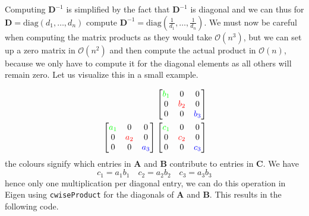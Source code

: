 \documentclass{article}
\begin{document}
Computing $\mathbf{D}^{-1}$ is simplified by the fact that $\mathbf{D}^{-1}$ is diagonal and we can thus for $\mathbf{D} = \text{diag}\left(d_{1}, \dots, d_{n}\right)$ compute $\mathbf{D}^{-1} = \text{diag}\left(\frac{1}{d_{1}}, \dots, \frac{1}{d_{n}}\right)$. We must now be careful when computing the matrix products as they would take $\mathcal{O}\left(n^{3}\right)$, but we can set up a zero matrix in $\mathcal{O}\left(n^{2}\right)$ and then compute the actual product in $\mathcal{O}\left(n\right)$, because we only have to compute it for the diagonal elements as all others will remain zero. Let us visualize this in a small example.

\begin{align*}
&\phantom{
    \begin{bmatrix}
        1 & 0 & 0 \\
        0 & 2 & 0 \\
        0 & 0 & 3
    \end{bmatrix}}\hspace{16px}
    \begin{bmatrix}
        \color{green}b_{1}\color{black} & 0 & 0 \\
        0 & \color{red}b_{2}\color{black} & 0 \\
        0 & 0 & \color{blue}b_{3}\color{black}
    \end{bmatrix} \\ 
    &\begin{bmatrix}
        \color{green}a_{1}\color{black} & 0 & 0 \\
        0 & \color{red}a_{2}\color{black} & 0 \\
        0 & 0 & \color{blue}a_{3}\color{black}
    \end{bmatrix}
    \begin{bmatrix}
        \color{green}c_{1}\color{black} & 0 & 0 \\
        0 & \color{red}c_{2}\color{black} & 0 \\
        0 & 0 & \color{blue}c_{3}\color{black}
    \end{bmatrix}
\end{align*}
the colours signify which entries in $\mathbf{A}$ and $\mathbf{B}$ contribute to entries in $\mathbf{C}$. We have
\begin{equation*}
    c_{1} = a_{1}b_{1} \quad c_{2} = a_{2}b_{2} \quad c_{3} = a_{3}b_{3}
\end{equation*}
hence only one multiplication per diagonal entry, we can do this operation in Eigen using \verb|cwiseProduct| for the diagonals of $\mathbf{A}$ and $\mathbf{B}$. This results in the following code.
\end{document}
